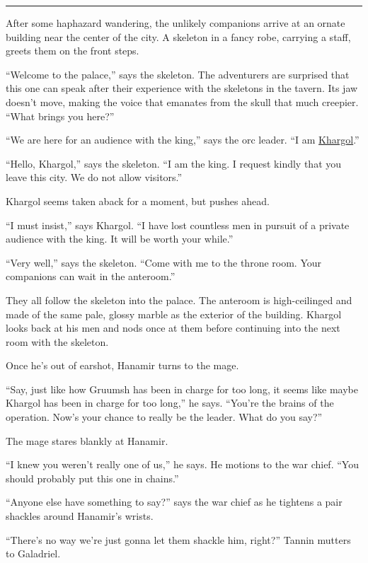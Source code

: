 \documentclass[smalldemyvopaper,11pt,twoside,onecolumn,openright,extrafontsizes]{memoir}
\begin{document}
\begin{center}\rule{0.5\linewidth}{\linethickness}\end{center}

After some haphazard wandering, the unlikely companions arrive at an
ornate building near the center of the city. A skeleton in a fancy robe,
carrying a staff, greets them on the front steps.

``Welcome to the palace,'' says the skeleton. The adventurers are
surprised that this one can speak after their experience with the
skeletons in the tavern. Its jaw doesn't move, making the voice that
emanates from the skull that much creepier. ``What brings you here?''

``We are here for an audience with the king,'' says the orc leader. ``I
am \href{/characters/khargol/}{Khargol}.''

``Hello, Khargol,'' says the skeleton. ``I am the king. I request kindly
that you leave this city. We do not allow visitors.''

Khargol seems taken aback for a moment, but pushes ahead.

``I must insist,'' says Khargol. ``I have lost countless men in pursuit
of a private audience with the king. It will be worth your while.''

``Very well,'' says the skeleton. ``Come with me to the throne room.
Your companions can wait in the anteroom.''

They all follow the skeleton into the palace. The anteroom is
high-ceilinged and made of the same pale, glossy marble as the exterior
of the building. Khargol looks back at his men and nods once at them
before continuing into the next room with the skeleton.

Once he's out of earshot, Hanamir turns to the mage.

``Say, just like how Gruumsh has been in charge for too long, it seems
like maybe Khargol has been in charge for too long,'' he says. ``You're
the brains of the operation. Now's your chance to really be the leader.
What do you say?''

The mage stares blankly at Hanamir.

``I knew you weren't really one of us,'' he says. He motions to the war
chief. ``You should probably put this one in chains.''

``Anyone else have something to say?'' says the war chief as he tightens
a pair shackles around Hanamir's wrists.

``There's no way we're just gonna let them shackle him, right?'' Tannin
mutters to Galadriel.
\end{document}
